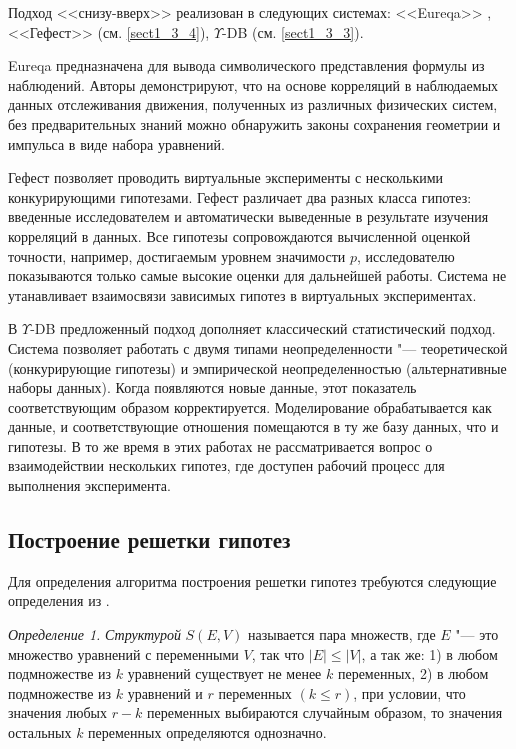 Подход <<снизу-вверх>> реализован в следующих системах: <<Eureqa>> \cite{Schmidt2009}, 
<<Гефест>> (см. \cref{sect1_3_4}), $\Upsilon$-DB (см. \cref{sect1_3_3}).

Eureqa предназначена для вывода символического представления формулы из наблюдений. Авторы демонстрируют, что на основе 
корреляций в наблюдаемых данных отслеживания движения, полученных из различных физических систем, без предварительных 
знаний можно обнаружить законы сохранения геометрии и импульса в виде набора уравнений.

Гефест позволяет проводить виртуальные эксперименты с несколькими конкурирующими гипотезами. Гефест различает два 
разных класса гипотез: введенные исследователем и автоматически выведенные в результате изучения корреляций в данных. 
Все гипотезы сопровождаются вычисленной оценкой точности, например, достигаемым уровнем значимости $p$, исследователю 
показываются только самые высокие оценки для дальнейшей работы. Система не утанавливает взаимосвязи зависимых гипотез 
в виртуальных экспериментах.

В $\Upsilon$-DB предложенный подход дополняет классический статистический подход. Система позволяет работать с двумя 
типами неопределенности "--- теоретической (конкурирующие гипотезы) и эмпирической неопределенностью (альтернативные 
наборы данных). Когда появляются новые данные, этот показатель соответствующим образом корректируется. Моделирование 
обрабатывается как данные, и соответствующие отношения помещаются в ту же базу данных, что и гипотезы. В то же время 
в этих работах не рассматривается вопрос о взаимодействии нескольких гипотез, где доступен рабочий процесс для 
выполнения эксперимента.

\subsection{Построение решетки гипотез} \label{sect2_3_1}
Для определения алгоритма построения решетки гипотез требуются следующие определения из 
\cite{Goncalves2016, kovalev2019constructing}.

\textit{Определение 1.} \textit{Структурой} $S\left(E, V\right)$ называется пара множеств, где $E$ "--- 
это множество уравнений с переменными $V$, так что $|E| \leq |V| $, а так же: 1) в любом подмножестве из $k$ 
уравнений существует не менее $k$ переменных, 2) в любом подмножестве из $k$ уравнений и $r$ 
переменных $\left(k\leq r\right)$, при условии, что значения любых $r-k$ переменных выбираются случайным 
образом, то значения остальных $k$ переменных определяются однозначно.


